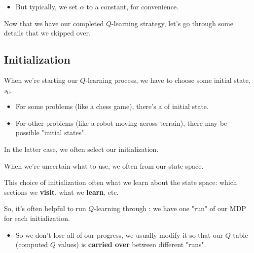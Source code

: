         \begin{itemize}
            \item But typically, we set $\alpha$ to a constant, for convenience.
        \end{itemize}

    \pagebreak

        Now that we have our completed $Q$-learning strategy, let's go through some details that we skipped over.

    \subsection{Initialization}

        When we're starting our $Q$-learning process, we have to choose some initial state, $s_0$.

        \begin{itemize}
            \item For some problems (like a chess game), there's a  of initial state.
            \item For other problems (like a robot moving across terrain), there may be  possible "initial states". 
        \end{itemize}

        In the latter case, we often  select our initialization.\\

        \begin{concept}
            When we're uncertain what  to use, we often  from our state space.
        \end{concept}

        This choice of initialization often  what we learn about the state space: which sections we \textbf{visit}, what we \textbf{learn}, etc.

        So, it's often helpful to run $Q$-learning through : we have one "run" of our MDP for each initialization.

        \begin{itemize}
            \item So we don't lose all of our progress, we usually modify it so that our $Q$-table (computed $Q$ values) is \textbf{carried over} between different "runs".\\
        \end{itemize}

